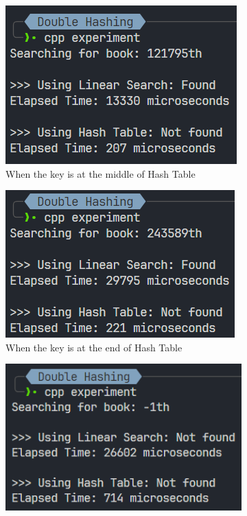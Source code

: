 \begin{itemize}
\begin{figure}[!ht]
\begin{subfigure}{0.45\textwidth}
			      \centering
			      \includegraphics[width=\textwidth]{imgs/Double Hashing/mid.png}
			      \caption{When the key is at the middle of Hash Table}\label{fig:dblhashing-mid-metric}
		      \end{subfigure}
		      \hfill
		      \begin{subfigure}{0.45\textwidth}
			      \centering
			      \includegraphics[width=\textwidth]{imgs/Double Hashing/end.png}
			      \caption{When the key is at the end of Hash Table}\label{fig:dblhashing-end-metric}
		      \end{subfigure}
		      \hfill
		      \begin{subfigure}{0.45\textwidth}
			      \centering
			      \includegraphics[width=\textwidth]{imgs/Double Hashing/not-found.png}

\end{subfigure}
\end{figure}
\end{itemize}
